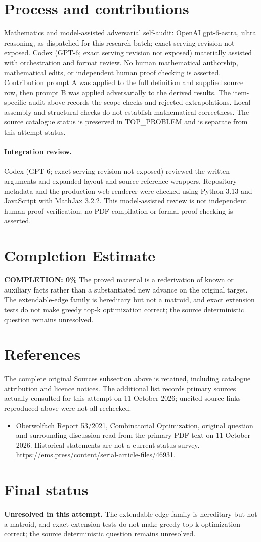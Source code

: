 \documentclass[11pt]{article}
\begin{document}
\section{Process and contributions}
Mathematics and model-assisted adversarial self-audit: OpenAI gpt-6-astra, ultra reasoning, as dispatched for this research batch; exact serving revision not exposed. Codex (GPT-6; exact serving revision not exposed) materially assisted with orchestration and format review. No human mathematical authorship, mathematical edits, or independent human proof checking is asserted.
Contribution prompt A was applied to the full definition and supplied source row, then prompt B was applied adversarially to the derived results. The item-specific audit above records the scope checks and rejected extrapolations. Local assembly and structural checks do not establish mathematical correctness. The source catalogue status is preserved in TOP\_PROBLEM and is separate from this attempt status.
\paragraph{Integration review.} Codex (GPT-6; exact serving revision not exposed) reviewed the written arguments and expanded layout and source-reference wrappers. Repository metadata and the production web renderer were checked using Python 3.13 and JavaScript with MathJax 3.2.2. This model-assisted review is not independent human proof verification; no PDF compilation or formal proof checking is asserted.

\section{Completion Estimate}
\noindent\textbf{COMPLETION: 0\%}
The proved material is a rederivation of known or auxiliary facts rather than a substantiated new advance on the original target. The extendable-edge family is hereditary but not a matroid, and exact extension tests do not make greedy top-k optimization correct; the source deterministic question remains unresolved.
\section{References}
The complete original Sources subsection above is retained, including catalogue attribution and licence notices. The additional list records primary sources actually consulted for this attempt on 11 October 2026; uncited source links reproduced above were not all rechecked.
\begin{itemize}
\item Oberwolfach Report 53/2021, Combinatorial Optimization, original question and surrounding discussion read from the primary PDF text on 11 October 2026. Historical statements are not a current-status survey. \url{https://ems.press/content/serial-article-files/46931}.
\end{itemize}
\section{Final status}
\textbf{Unresolved in this attempt.} The extendable-edge family is hereditary but not a matroid, and exact extension tests do not make greedy top-k optimization correct; the source deterministic question remains unresolved.
\end{document}
